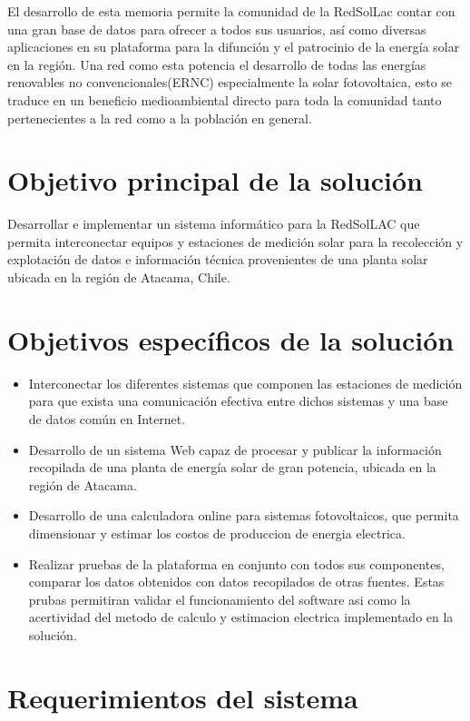 El desarrollo de esta memoria permite la comunidad de la RedSolLac contar con una gran base de datos para ofrecer a todos sus usuarios, así como diversas aplicaciones en su plataforma para la difunción y el patrocinio de la energía solar en la región. Una red como esta potencia el desarrollo de todas las energías renovables no convencionales(ERNC) especialmente la solar fotovoltaica, esto se traduce en un beneficio medioambiental directo para toda la comunidad tanto pertenecientes a la red como a la población en general.

\section{Objetivo principal de la solución}
Desarrollar e implementar un sistema informático para la RedSolLAC que permita interconectar equipos y estaciones de medición solar para la recolección y explotación de datos e información técnica provenientes de una planta solar ubicada en la región de Atacama, Chile.

\section{Objetivos específicos de la solución}
\begin{itemize}
\item Interconectar los diferentes sistemas que componen las estaciones de medición para que exista una comunicación efectiva entre dichos sistemas y una base de datos común en Internet.
\item Desarrollo de un sistema Web capaz de procesar y publicar la información recopilada de una planta de energía solar de gran potencia, ubicada en la región de Atacama.
\item Desarrollo de una calculadora online para sistemas fotovoltaicos, que permita dimensionar y estimar los costos de produccion de energia electrica.
\item Realizar pruebas de la plataforma en conjunto con todos sus componentes, comparar los datos obtenidos con datos recopilados de otras fuentes. Estas prubas permitiran validar el funcionamiento del software asi como la acertividad del metodo de calculo y estimacion electrica implementado en la solución.
\end{itemize}

\section{Requerimientos del sistema}

